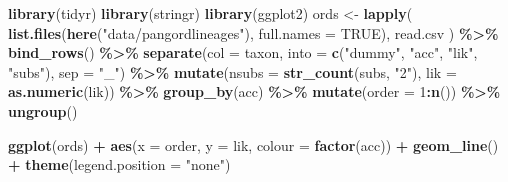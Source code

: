 \documentclass[
]{article}
\newenvironment{Shaded}{\begin{snugshade}}{\end{snugshade}}
\newcommand{\DataTypeTok}[1]{\textcolor[rgb]{0.13,0.29,0.53}{#1}}
\newcommand{\DecValTok}[1]{\textcolor[rgb]{0.00,0.00,0.81}{#1}}
\newcommand{\KeywordTok}[1]{\textcolor[rgb]{0.13,0.29,0.53}{\textbf{#1}}}
\newcommand{\NormalTok}[1]{#1}
\newcommand{\OperatorTok}[1]{\textcolor[rgb]{0.81,0.36,0.00}{\textbf{#1}}}
\newcommand{\OtherTok}[1]{\textcolor[rgb]{0.56,0.35,0.01}{#1}}
\newcommand{\StringTok}[1]{\textcolor[rgb]{0.31,0.60,0.02}{#1}}
\begin{document}
\begin{Shaded}
\begin{Highlighting}[]
\KeywordTok{library}\NormalTok{(tidyr)}
\KeywordTok{library}\NormalTok{(stringr)}
\KeywordTok{library}\NormalTok{(ggplot2)}
\NormalTok{ords \textless{}{-}}\StringTok{ }\KeywordTok{lapply}\NormalTok{(}
    \KeywordTok{list.files}\NormalTok{(}\KeywordTok{here}\NormalTok{(}\StringTok{"data/pangordlineages"}\NormalTok{),}
        \DataTypeTok{full.names =} \OtherTok{TRUE}\NormalTok{),}
\NormalTok{    read.csv}
\NormalTok{    ) }\OperatorTok{\%\textgreater{}\%}
\StringTok{    }\KeywordTok{bind\_rows}\NormalTok{() }\OperatorTok{\%\textgreater{}\%}
\StringTok{    }\KeywordTok{separate}\NormalTok{(}\DataTypeTok{col =}\NormalTok{ taxon, }
        \DataTypeTok{into =} \KeywordTok{c}\NormalTok{(}\StringTok{"dummy"}\NormalTok{, }\StringTok{"acc"}\NormalTok{, }\StringTok{"lik"}\NormalTok{, }\StringTok{"subs"}\NormalTok{),}
        \DataTypeTok{sep =} \StringTok{"\_"}\NormalTok{) }\OperatorTok{\%\textgreater{}\%}
\StringTok{    }\KeywordTok{mutate}\NormalTok{(}\DataTypeTok{nsubs =} \KeywordTok{str\_count}\NormalTok{(subs, }\StringTok{"2"}\NormalTok{),}
        \DataTypeTok{lik =} \KeywordTok{as.numeric}\NormalTok{(lik)) }\OperatorTok{\%\textgreater{}\%}
\StringTok{    }\KeywordTok{group\_by}\NormalTok{(acc) }\OperatorTok{\%\textgreater{}\%}
\StringTok{    }\KeywordTok{mutate}\NormalTok{(}\DataTypeTok{order =} \DecValTok{1}\OperatorTok{:}\KeywordTok{n}\NormalTok{()) }\OperatorTok{\%\textgreater{}\%}
\StringTok{    }\KeywordTok{ungroup}\NormalTok{()}
\end{Highlighting}
\end{Shaded}

\begin{Shaded}
\begin{Highlighting}[]
\KeywordTok{ggplot}\NormalTok{(ords) }\OperatorTok{+}
\StringTok{    }\KeywordTok{aes}\NormalTok{(}\DataTypeTok{x =}\NormalTok{ order, }\DataTypeTok{y =}\NormalTok{ lik, }\DataTypeTok{colour =} \KeywordTok{factor}\NormalTok{(acc)) }\OperatorTok{+}\StringTok{ }
\StringTok{    }\KeywordTok{geom\_line}\NormalTok{() }\OperatorTok{+}
\StringTok{    }\KeywordTok{theme}\NormalTok{(}\DataTypeTok{legend.position =} \StringTok{"none"}\NormalTok{)}
\end{Highlighting}
\end{Shaded}
\end{document}
